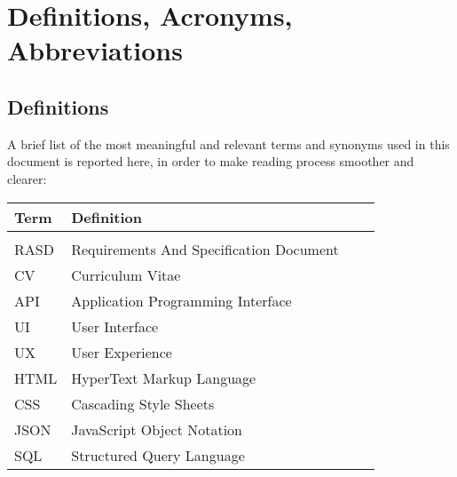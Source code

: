 \newpage
\section{Definitions, Acronyms, Abbreviations}

\subsection{Definitions}

A brief list of the most meaningful and relevant terms and synonyms used in this document is reported
here, in order to make reading process smoother and clearer:

\begin{table}[h!]
    \centering
    \begin{tabularx}{\textwidth}{XXXX} %
    \toprule
    \textbf{Term} & \textbf{Definition} \\
    \midrule
    \vspace{5mm} \\
    RASD & Requirements And Specification Document \vspace{5mm} \\
    CV & Curriculum Vitae \vspace{5mm} \\
    API & Application Programming Interface \vspace{5mm} \\
    UI & User Interface \vspace{5mm} \\
    UX & User Experience \vspace{5mm} \\
    HTML & HyperText Markup Language \vspace{5mm} \\
    CSS & Cascading Style Sheets \vspace{5mm} \\
    JSON & JavaScript Object Notation \vspace{5mm} \\
    SQL & Structured Query Language \vspace{5mm} \\
    \bottomrule
    \end{tabularx}
\end{table}

